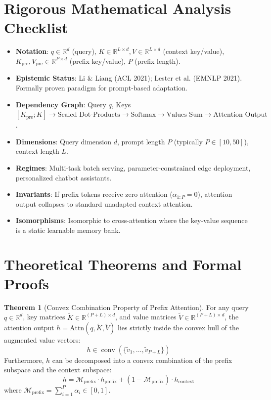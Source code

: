 \documentclass[11pt,a4paper]{article}
\theoremstyle{definition}
\newtheorem{theorem}{\textbf{Theorem}}[section]
\begin{document}
\section{Rigorous Mathematical Analysis Checklist}

\begin{itemize}
    \item \textbf{Notation}: $q \in \mathbb{R}^d$ (query), $K \in \mathbb{R}^{L \times d}, V \in \mathbb{R}^{L \times d}$ (context key/value), $K_{\text{pre}}, V_{\text{pre}} \in \mathbb{R}^{P \times d}$ (prefix key/value), $P$ (prefix length).
    \item \textbf{Epistemic Status}: Li \& Liang (ACL 2021); Lester et al. (EMNLP 2021). Formally proven paradigm for prompt-based adaptation.
    \item \textbf{Dependency Graph}: Query $q$, Keys $[K_{\text{pre}}; K] \to \text{Scaled Dot-Products} \to \text{Softmax} \to \text{Values Sum} \to \text{Attention Output}$.
    \item \textbf{Dimensions}: Query dimension $d$, prompt length $P$ (typically $P \in [10, 50]$), context length $L$.
    \item \textbf{Regimes}: Multi-task batch serving, parameter-constrained edge deployment, personalized chatbot assistants.
    \item \textbf{Invariants}: If prefix tokens receive zero attention ($\alpha_{1:P} = 0$), attention output collapses to standard unadapted context attention.
    \item \textbf{Isomorphisms}: Isomorphic to cross-attention where the key-value sequence is a static learnable memory bank.
\end{itemize}

\section{Theoretical Theorems and Formal Proofs}

\begin{theorem}[Convex Combination Property of Prefix Attention]
For any query $q \in \mathbb{R}^d$, key matrices $\tilde{K} \in \mathbb{R}^{(P+L) \times d}$, and value matrices $\tilde{V} \in \mathbb{R}^{(P+L) \times d}$, the attention output $h = \text{Attn}(q, \tilde{K}, \tilde{V})$ lies strictly inside the convex hull of the augmented value vectors:
{\boldmath
\begin{equation}
h \in \operatorname{conv}\left( \{ \tilde{v}_1, \dots, \tilde{v}_{P+L} \} \right)
\end{equation}
}
Furthermore, $h$ can be decomposed into a convex combination of the prefix subspace and the context subspace:
{\boldmath
\begin{equation}
h = \mathcal{M}_{\text{prefix}} \cdot h_{\text{prefix}} + (1 - \mathcal{M}_{\text{prefix}}) \cdot h_{\text{context}}
\end{equation}
}
where $\mathcal{M}_{\text{prefix}} = \sum_{i=1}^P \alpha_i \in [0, 1]$.
\end{theorem}
\end{document}
